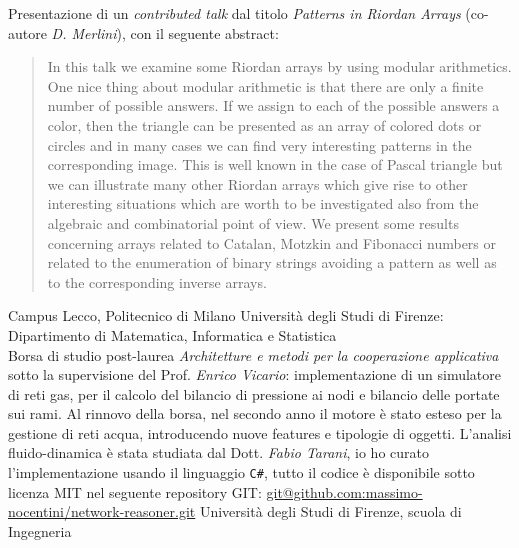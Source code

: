 \documentclass[totpages,openbib,italian]{europecv}
\begin{document}


\begin{europecv}
\ecvpersonalinfo[20pt]



{Presentazione di un \emph{contributed talk} dal titolo \emph{Patterns in Riordan Arrays} 
    (co-autore \emph{D. Merlini}), con il seguente abstract:
\begin{quote}
In this talk we examine some Riordan arrays by using modular arithmetics. 
One nice thing about modular arithmetic is that there are only a finite number of possible answers.
If we assign to each of the possible answers a color, then the triangle can be 
presented as an array of colored dots or circles and in many cases we can find 
very interesting patterns in the corresponding image. This is well known in the case of 
Pascal triangle but we can illustrate many other Riordan arrays which give rise to 
other interesting situations which are worth to be investigated also from the 
algebraic and combinatorial point of view. We present some results concerning 
arrays related to Catalan, Motzkin and Fibonacci numbers or related to the 
enumeration of binary strings avoiding a pattern as well as to the corresponding inverse arrays.
\end{quote}}
{Campus Lecco, Politecnico di Milano}
{Universit\`a degli Studi di Firenze: Dipartimento di Matematica, Informatica e Statistica}
\\
{Borsa di studio post-laurea \emph{Architetture e metodi
 per la cooperazione applicativa} sotto la supervisione del
 Prof. \emph{Enrico Vicario}: implementazione di un simulatore
 di reti gas, per il calcolo del bilancio di pressione ai nodi
 e bilancio delle portate sui rami. Al rinnovo della borsa,
 nel secondo anno il motore \`e stato esteso per la gestione
 di reti acqua, introducendo nuove features e tipologie di oggetti.
 L'analisi fluido-dinamica \`e stata studiata dal Dott. \emph{Fabio Tarani}, 
 io ho curato l'implementazione usando il linguaggio \texttt{C\#},
 tutto il codice \`e disponibile sotto licenza MIT nel seguente
 repository GIT: \url{git@github.com:massimo-nocentini/network-reasoner.git} }
{Universit\`a degli Studi di Firenze, scuola di Ingegneria}


\end{europecv}
\end{document}

